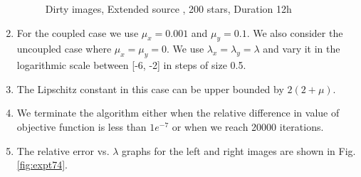 \begin{enumerate}
\begin{figure}[h!]
\hspace{0.4in}
		\hspace{0.2in}
\caption [Dirty images, Extended source, 200 stars, Duration 12h]{Dirty images, Extended source , 200 stars, Duration 12h}
\label{fig:expt73}
\end{figure}


\item For the coupled case we use $\mu_x = 0.001$ and $\mu_y = 0.1$. We also consider the uncoupled case where $\mu_x = \mu_y = 0$.  We use $\lambda_x = \lambda_y = \lambda$ and vary it in the logarithmic scale between [-6, -2] in steps of size 0.5. 
\item The Lipschitz constant in this case can be upper bounded by $2(2 + \mu)$.
\item We terminate the algorithm either when the relative difference in value of objective function is less than $1e^{-7}$ or when we reach 20000 iterations.
\item The relative error vs.  $\lambda$ graphs for the left and right images are shown in Fig. \ref{fig:expt74}.


\end{enumerate}
